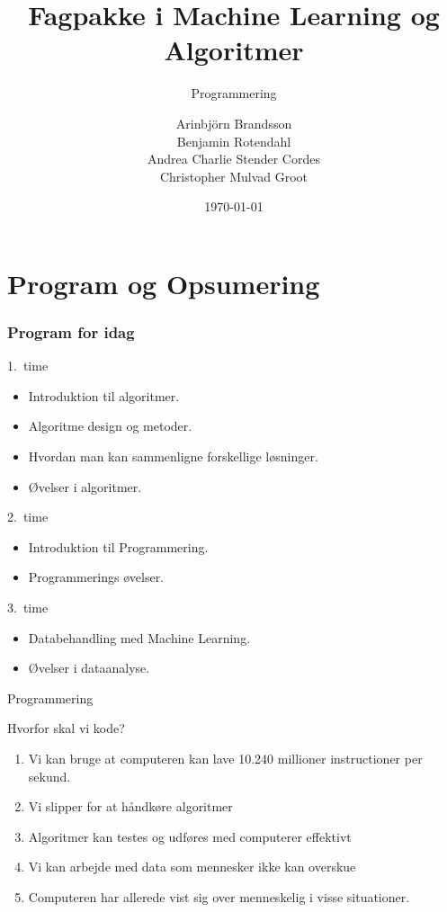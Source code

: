 \documentclass[12pt,t]{beamer}
\title{Fagpakke i Machine Learning og Algoritmer}
\subtitle{Programmering}
\author{
Arinbjörn Brandsson \\
Benjamin Rotendahl  \\
Andrea Charlie Stender Cordes \\
Christopher Mulvad Groot\\
}
\date[]{\today}
\begin{document}
\frame[plain]{\titlepage}
 \frame{\tableofcontents}

\section{Program og Opsumering}

\begin{frame}
    \frametitle{Program for idag}
    \begin{block}{1.\ time}
        \begin{itemize}
            \item Introduktion til algoritmer.
            \item Algoritme design og metoder.
            \item Hvordan man kan sammenligne forskellige løsninger.
            \item Øvelser i algoritmer.
        \end{itemize}
    \end{block}
    \begin{block}{2.\ time}
        \begin{itemize}
            \item \alert{Introduktion til Programmering.}
            \item \alert{Programmerings øvelser.}
        \end{itemize}
    \end{block}
    \begin{block}{3.\ time}
        \begin{itemize}
            \item Databehandling med Machine Learning.
            \item Øvelser i dataanalyse.
        \end{itemize}
    \end{block}
\end{frame}

\begin{frame}{Programmering}
        \begin{block}{Hvorfor skal vi kode?}
            \begin{enumerate}
                \item Vi kan bruge at computeren kan lave 10.240 millioner
                      instructioner per sekund. \pause
                \item Vi slipper for at håndkøre algoritmer \pause
                \item Algoritmer kan testes og udføres med computerer effektivt \pause
                \item Vi kan arbejde med data som mennesker ikke kan overskue \pause
                \item Computeren har allerede vist sig over menneskelig i visse
                situationer.
            \end{enumerate}
        \end{block}
    \end{frame}
\end{document}
